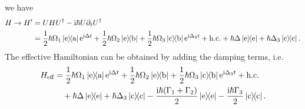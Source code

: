 \documentclass[hyperref, a4paper]{article}
\newcommand*{\ii}{\mathrm{i}}
\newcommand*{\ee}{\mathrm{e}}
\begin{document}
\begin{itemize}
\begin{equation}
\end{equation}
we have 
\begin{equation}
    \begin{aligned}
        H \to H' &= U H U^\dagger - \ii \hbar U \partial_t U^\dagger \\
        &= \frac{1}{2} \hbar \Omega_1 \dyad*{\text{e}}{\text{a}} \ee^{\ii \Delta t} 
        + \frac{1}{2} \hbar \Omega_2 \dyad*{\text{e}}{\text{b}} 
        + \frac{1}{2} \hbar \Omega_3 \dyad*{\text{c}}{\text{b}} \ee^{\ii \Delta_3 t} + \text{h.c.}
        + \hbar \Delta \dyad{\text{e}} + \hbar \Delta_3 \dyad*{\text{c}}.
    \end{aligned}
    \label{eq:ham-3}
\end{equation}
The effective Hamiltonian can be obtained by adding the damping terms, i.e. 
\begin{equation}
    \begin{aligned}
        H_\text{eff} &= \frac{1}{2} \hbar \Omega_1 \dyad*{\text{e}}{\text{a}} \ee^{\ii \Delta t} 
        + \frac{1}{2} \hbar \Omega_2 \dyad*{\text{e}}{\text{b}} 
        + \frac{1}{2} \hbar \Omega_3 \dyad*{\text{c}}{\text{b}} \ee^{\ii \Delta_3 t} + \text{h.c.} \\
        &\quad + \hbar \Delta \dyad{\text{e}} + \hbar \Delta_3 \dyad*{\text{c}}
        - \frac{\ii \hbar (\Gamma_1 + \Gamma_2)}{2} \dyad{\text{e}} - \frac{\ii \hbar \Gamma_3}{2} \dyad*{\text{c}}.
    \end{aligned}
\end{equation}


\end{itemize}
\end{document}
